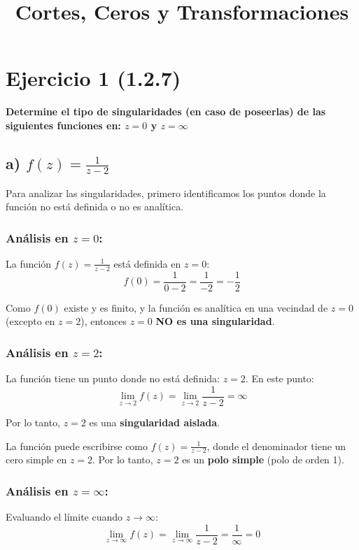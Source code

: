 \documentclass{article}
\title{Cortes, Ceros y Transformaciones}
\author{}
\date{}
\begin{document}
\maketitle

\section*{Ejercicio 1 (1.2.7)}

\textbf{Determine el tipo de singularidades (en caso de poseerlas) de las siguientes funciones en: $z = 0$ y $z = \infty$}

\subsection*{a) $f(z) = \frac{1}{z - 2}$}

Para analizar las singularidades, primero identificamos los puntos donde la función no está definida o no es analítica.

\subsubsection*{Análisis en $z = 0$:}

La función $f(z) = \frac{1}{z - 2}$ está definida en $z = 0$:
$$f(0) = \frac{1}{0 - 2} = \frac{1}{-2} = -\frac{1}{2}$$

Como $f(0)$ existe y es finito, y la función es analítica en una vecindad de $z = 0$ (excepto en $z = 2$), entonces $z = 0$ \textbf{NO es una singularidad}.

\subsubsection*{Análisis en $z = 2$:}

La función tiene un punto donde no está definida: $z = 2$. En este punto:
$$\lim_{z \to 2} f(z) = \lim_{z \to 2} \frac{1}{z - 2} = \infty$$

Por lo tanto, $z = 2$ es una \textbf{singularidad aislada}. 

La función puede escribirse como $f(z) = \frac{1}{z - 2}$, donde el denominador tiene un cero simple en $z = 2$. Por lo tanto, $z = 2$ es un \textbf{polo simple} (polo de orden 1).

\subsubsection*{Análisis en $z = \infty$:}

Evaluando el límite cuando $z \to \infty$:
$$\lim_{z \to \infty} f(z) = \lim_{z \to \infty} \frac{1}{z - 2} = \frac{1}{\infty} = 0$$
\end{document}
